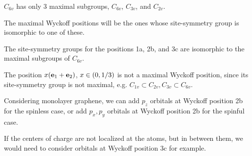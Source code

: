 \documentclass[10pt,aspectratio=169,xcolor={table,dvipsnames}]{beamer}
\begin{document}
\begin{frame}

$C_{6v}$ has only 3 maximal subgroups, $C_{6v}$, $C_{3v}$, and $C_{2v}$.

The maximal Wyckoff positions will be the ones whose site-symmetry group is isomorphic to one of these.

The site-symmetry groups for the positions 1a, 2b, and 3c are isomorphic to the maximal subgroups of $C_{6v}$.

The position $x ({\vb{e}}_1 + {\vb{e}}_2)$, $x \in \qty(0, 1/3)$ is not a maximal Wyckoff position, since its site-symmetry group is not maximal, e.g. $C_{1v} \subset C_{2v}, C_{3v} \subset C_{6v}$.

\n

Considering monolayer graphene, we can add $p_z$ orbitals at Wyckoff position 2b for the spinless case, or add $p_x, p_y$ orbitals at Wyckoff position 2b for the spinful case.

If the centers of charge are not localized at the atoms, but in between them, we would need to consider orbitals at Wyckoff position 3c for example.

\n


\end{frame}
\end{document}
